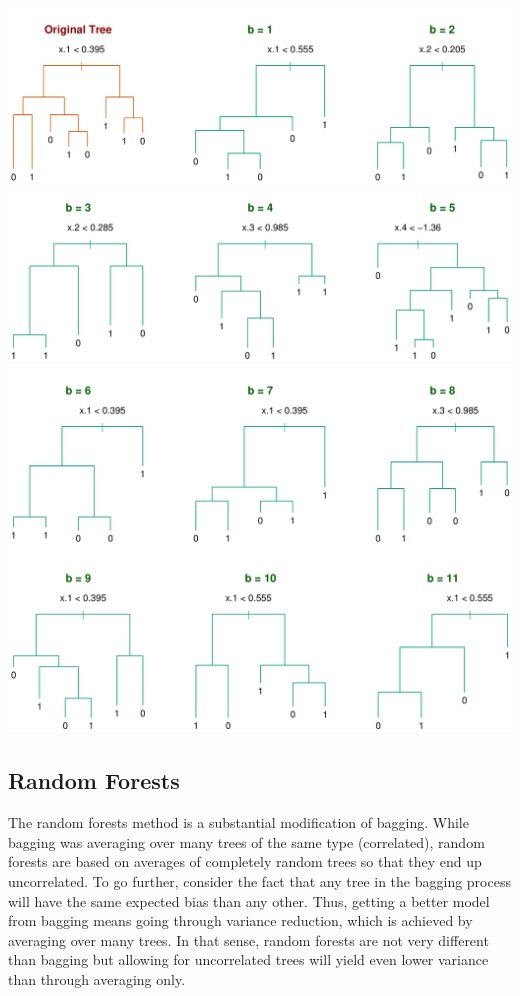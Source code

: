 \documentclass[12pt]{report}
\begin{document}
\begin{center}
\includegraphics[scale=0.35]{images/bag1.png}
\includegraphics[scale=0.35]{images/b2.png}
\includegraphics[scale=0.35]{images/bag3.png}
\includegraphics[scale=0.35]{images/bag4.png}
\end{center}

\subsection{Random Forests}

The random forests method is a substantial modification of bagging.  While bagging was averaging over many trees of the same type (correlated), random forests are based on averages of completely random trees so that they end up uncorrelated. To go further, consider the fact that any tree in the bagging process will have the same expected bias than any other. Thus, getting a better model from bagging means going through variance reduction, which is achieved by averaging over many trees. In that sense, random forests are not very different than bagging but allowing for uncorrelated trees will yield even lower variance than through averaging only.
\end{document}
